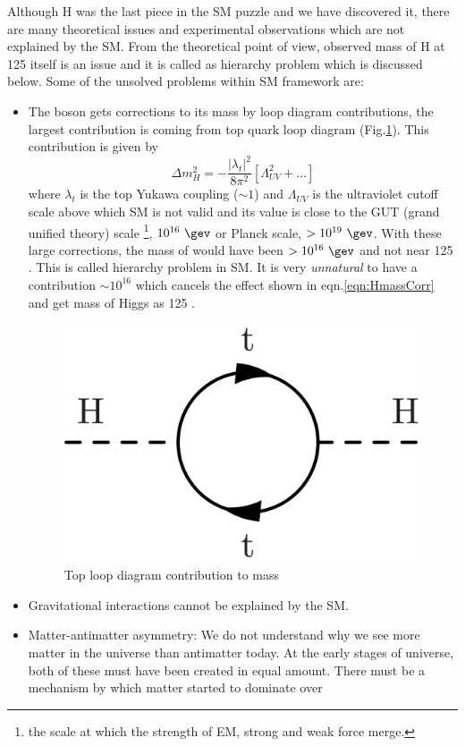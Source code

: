 Although H was the last piece in the SM puzzle and we have discovered it, there are many theoretical issues and experimental observations
which are not explained by the SM. From the theoretical point of view, observed mass of H at 125 \gev itself is an issue and it is called as 
hierarchy problem which is discussed below. Some of the unsolved problems within SM framework are:
\begin{itemize}
\item The \higgs boson gets corrections to its mass by loop diagram contributions, the largest contribution is coming from top quark loop 
diagram (Fig.\ref{fig:hierarchy_problem_higgs}). This contribution is given by
\begin{equation}
\Delta m_{H}^2 = -\frac{|\lambda_t|^2}{8\pi^2}[\Lambda_{UV}^2 + \dots]
\label{eqn:HmassCorr}
\end{equation}
where $\lambda_t$ is the top Yukawa coupling ($\sim 1$) and $\Lambda_{UV}$ is the ultraviolet cutoff scale above which SM is not valid and 
its value is close to the GUT (grand unified theory) scale \footnote{the scale at which the strength of EM, strong and weak force merge.}, 
$10^{16}\ \gev$ or Planck scale, $> 10^{19}\ \gev$. With these large corrections, the mass of \higgs would have been $> 10^{16}\ \gev$ and 
not near 125 \gev. This is called hierarchy problem in SM. It is very \textit{unnatural} to have a contribution $\sim 10^{16}$ \gev which 
cancels the effect shown in eqn.\ref{eqn:HmassCorr} and get mass of Higgs as 125 \gev.
\begin{figure}[h!]
\centering
\includegraphics[width=0.35\linewidth]{../Figures/Chap1/hierarchy_problem_higgs.png}
\caption{Top loop diagram contribution to \higgs mass}
\label{fig:hierarchy_problem_higgs}
\end{figure}
\item Gravitational interactions cannot be explained by the SM.
\item Matter-antimatter asymmetry: We do not understand why we see more matter in the universe than antimatter today. At the early stages 
of universe, both of these must have been created in equal amount. There must be a mechanism by which matter started to dominate over 

\end{itemize}
